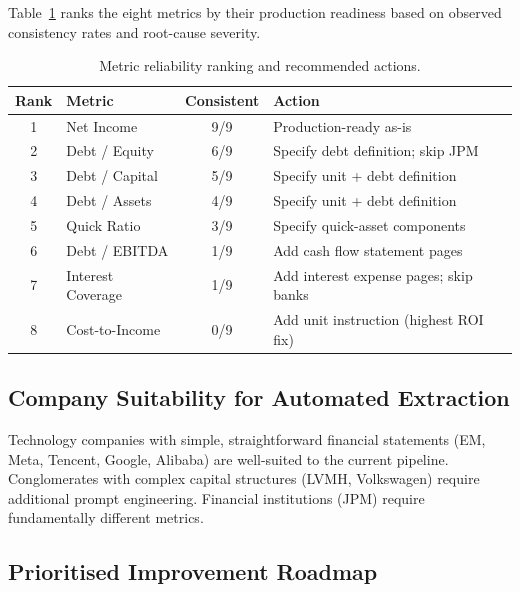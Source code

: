 \documentclass[12pt, a4paper]{article}
\begin{document}
Table~\ref{tab:ranking} ranks the eight metrics by their production readiness
based on observed consistency rates and root-cause severity.

\begin{table}[H]
\centering
\caption{Metric reliability ranking and recommended actions.}
\label{tab:ranking}
\begin{tabular}{clcp{5.5cm}}
\toprule
\textbf{Rank} & \textbf{Metric} & \textbf{Consistent} & \textbf{Action} \\
\midrule
1 & Net Income        & 9/9  & Production-ready as-is \\
2 & Debt / Equity     & 6/9  & Specify debt definition; skip JPM \\
3 & Debt / Capital    & 5/9  & Specify unit + debt definition \\
4 & Debt / Assets     & 4/9  & Specify unit + debt definition \\
5 & Quick Ratio       & 3/9  & Specify quick-asset components \\
6 & Debt / EBITDA     & 1/9  & Add cash flow statement pages \\
7 & Interest Coverage & 1/9  & Add interest expense pages; skip banks \\
8 & Cost-to-Income    & 0/9  & Add unit instruction (highest ROI fix) \\
\bottomrule
\end{tabular}
\end{table}

\subsection{Company Suitability for Automated Extraction}

Technology companies with simple, straightforward financial statements (EM,
Meta, Tencent, Google, Alibaba) are well-suited to the current pipeline.
Conglomerates with complex capital structures (LVMH, Volkswagen) require
additional prompt engineering.  Financial institutions (JPM) require
fundamentally different metrics.

\subsection{Prioritised Improvement Roadmap}
\end{document}
